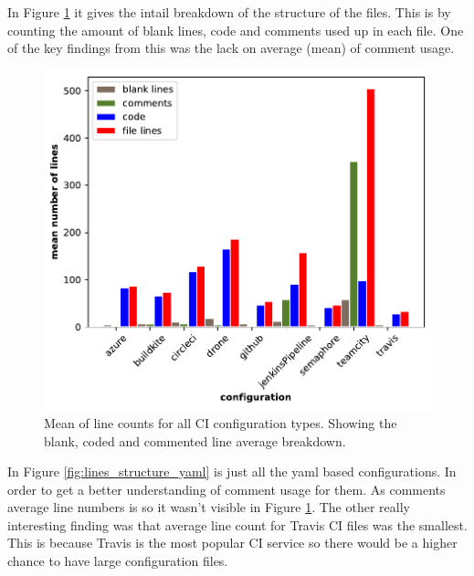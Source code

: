 \documentclass[twoside,12pt,titlepage,a4paper]{article}
\begin{document}
In Figure \ref{fig:lines_structure_all} it gives the intail breakdown of the structure of the files. This is by counting the amount of blank lines, code and comments used up in each file. One of the key findings from this was the lack on average (mean) of comment usage. 

\begin{figure}[!ht]
  \centering
  \includegraphics[width=\textwidth]{../src/results/line structure all.pdf}
  \caption[alt text]{Mean of line counts for all CI configuration types. Showing the blank, coded and commented line average breakdown.}
  \label{fig:lines_structure_all}
\end{figure}

In Figure \ref{fig:lines_structure_yaml} is just all the yaml based configurations. In order to get a better understanding of comment usage for them. As comments average line numbers is so it wasn't visible in Figure \ref{fig:lines_structure_all}. The other really interesting finding was that average line count for Travis CI files was the smallest. This is because Travis is the most popular CI service so there would be a higher chance to have large configuration files. 
\end{document}
